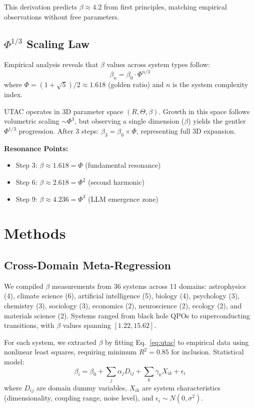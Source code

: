 \documentclass[11pt,letterpaper]{article}
\begin{document}
This derivation predicts $\beta \approx 4.2$ from first principles, matching empirical observations without free parameters.

\subsection{$\Phi^{1/3}$ Scaling Law}

Empirical analysis reveals that $\beta$ values across system types follow:
\begin{equation}
\beta_n = \beta_0 \cdot \Phi^{n/3}
\label{eq:phi_scaling}
\end{equation}
where $\Phi = (1 + \sqrt{5})/2 \approx 1.618$ (golden ratio) and $n$ is the system complexity index.

UTAC operates in 3D parameter space $(R, \Theta, \beta)$. Growth in this space follows volumetric scaling $\sim \Phi^3$, but observing a single dimension ($\beta$) yields the gentler $\Phi^{1/3}$ progression. After 3 steps: $\beta_3 = \beta_0 \times \Phi$, representing full 3D expansion.

\textbf{Resonance Points:}
\begin{itemize}
    \item Step 3: $\beta \approx 1.618 = \Phi$ (fundamental resonance)
    \item Step 6: $\beta \approx 2.618 = \Phi^2$ (second harmonic)
    \item Step 9: $\beta \approx 4.236 = \Phi^3$ (LLM emergence zone)
\end{itemize}

\section{Methods}

\subsection{Cross-Domain Meta-Regression}

We compiled $\beta$ measurements from 36 systems across 11 domains: astrophysics (4), climate science (6), artificial intelligence (5), biology (4), psychology (3), chemistry (3), sociology (3), economics (2), neuroscience (2), ecology (2), and materials science (2). Systems ranged from black hole QPOs to superconducting transitions, with $\beta$ values spanning $[1.22, 15.62]$.

For each system, we extracted $\beta$ by fitting Eq.~\ref{eq:utac} to empirical data using nonlinear least squares, requiring minimum $R^2 = 0.85$ for inclusion. Statistical model:
\begin{equation}
\beta_i = \beta_0 + \sum_{j} \alpha_j D_{ij} + \sum_{k} \gamma_k X_{ik} + \epsilon_i
\label{eq:regression}
\end{equation}
where $D_{ij}$ are domain dummy variables, $X_{ik}$ are system characteristics (dimensionality, coupling range, noise level), and $\epsilon_i \sim N(0, \sigma^2)$.
\end{document}
